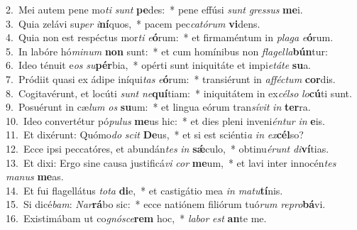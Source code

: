 {2.~}Mei autem pene mo\textit{ti} \textit{sunt} \textbf{pe}des:~* pene effúsi \textit{sunt} \textit{gres}\textit{sus} \textbf{me}i.\\
{3.~}Quia zelávi su\textit{per} \textit{i}\textbf{ní}quos,~* pacem pec\textit{ca}\textit{tó}\textit{rum} \textbf{vi}dens.\\
{4.~}Quia non est respéctus mor\textit{ti} \textit{e}\textbf{ó}rum:~* et firmaméntum in \textit{pla}\textit{ga} \textit{e}\textbf{ó}rum.\\
{5.~}In labóre hó\textit{mi}\textit{num} \textbf{non} sunt:~* et cum homínibus non \textit{fla}\textit{gel}\textit{la}\textbf{bún}tur:\\
{6.~}Ideo ténuit e\textit{os} \textit{su}\textbf{pér}bia,~* opérti sunt iniquitáte et impi\textit{e}\textit{tá}\textit{te} \textbf{su}a.\\
{7.~}Pródiit quasi ex ádipe iníqui\textit{tas} \textit{e}\textbf{ó}rum:~* transiérunt in \textit{af}\textit{fé}\textit{ctum} \textbf{cor}dis.\\
{8.~}Cogitavérunt, et locúti \textit{sunt} \textit{ne}\textbf{quí}tiam:~* iniquitátem in ex\textit{cél}\textit{so} \textit{lo}\textbf{cú}ti sunt.\\
{9.~}Posuérunt in cæ\textit{lum} \textit{os} \textbf{su}um:~* et lingua eórum tran\textit{sí}\textit{vit} \textit{in} \textbf{ter}ra.\\
{10.~}Ideo convertétur pó\textit{pu}\textit{lus} \textbf{me}us hic:~* et dies pleni inveni\textit{én}\textit{tur} \textit{in} \textbf{e}is.\\
{11.~}Et dixérunt: Quómo\textit{do} \textit{scit} \textbf{De}us,~* et si est sciénti\textit{a} \textit{in} \textit{ex}\textbf{cél}so?\\
{12.~}Ecce ipsi peccatóres, et abundán\textit{tes} \textit{in} \textbf{sǽ}culo,~* obtinu\textit{é}\textit{runt} \textit{di}\textbf{ví}tias.\\
{13.~}Et dixi: Ergo sine causa justificá\textit{vi} \textit{cor} \textbf{me}um,~* et lavi inter innocén\textit{tes} \textit{ma}\textit{nus} \textbf{me}as.\\
{14.~}Et fui flagellátus \textit{to}\textit{ta} \textbf{di}e,~* et castigátio mea \textit{in} \textit{ma}\textit{tu}\textbf{tí}nis.\\
{15.~}Si dicé\textit{bam}: \textit{Nar}\textbf{rá}bo sic:~* ecce natiónem filiórum tuó\textit{rum} \textit{re}\textit{pro}\textbf{bá}vi.\\
{16.~}Existimábam ut co\textit{gnó}\textit{sce}\textbf{rem} hoc,~* \textit{la}\textit{bor} \textit{est} \textbf{an}te me.\\
